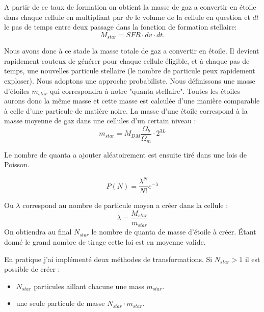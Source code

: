 A partir de ce taux de formation on obtient la masse de gaz a convertir en étoile dans chaque cellule en multipliant par $dv$ le volume de la cellule en question et $dt$ le pas de temps entre deux passage dans la fonction de formation stellaire:
\begin{equation}
	M_{star} = SFR \cdot dv \cdot dt .
\end{equation}

Nous avons donc à ce stade la masse totale de gaz a convertir en étoile.
Il devient rapidement couteux de générer pour chaque cellule éligible, et à chaque pas de temps, une nouvelles particule stellaire (le nombre de particule peux rapidement exploser).
Nous adoptons une approche probabiliste.
Nous définissons une masse d'étoiles $m_{star}$ qui correspondra à notre "quanta stellaire".
Toutes les étoiles aurons donc la même masse et cette masse est calculée d'une manière comparable à celle d'une particule de matière noire.
La masse d'une étoile correspond à la masse moyenne de gaz dans une cellules d'un certain niveau :
\begin{equation}
 m_{star} = M_{DM} \frac{\Omega_b}{\Omega_m}\cdot 2^{3L}
\end{equation}

Le nombre de quanta a ajouter aléatoirement est ensuite tiré dans une lois de Poisson.

\begin{equation}
	P(N) = \frac{\lambda^N}{N!} e^{-\lambda}
\end{equation}

Ou $\lambda$ correspond au nombre de particule moyen a créer dans la cellule :
\begin{equation}
\lambda = \frac{ M_{star}}{m_{star}}
\end{equation}
On obtiendra au final $N_{star}$ le nombre de quanta de masse d'étoile à créer.
Étant donné le grand nombre de tirage cette loi est en moyenne valide.

En pratique j'ai implémenté deux méthodes de transformations.
Si  $N_{star}>1$ il est possible de créer : 
\begin{itemize}
\item  $N_{star}$ particules aillant chacune une mass  $m_{star}$.
\item une seule particule de masse  $N_{star} \cdot m_{star}$.
\end{itemize}

